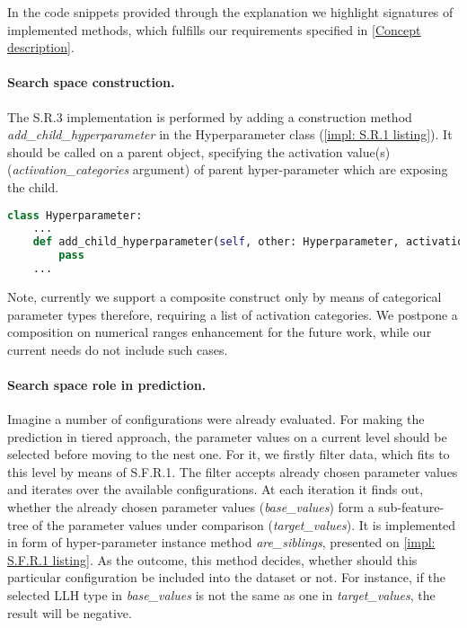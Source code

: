 In the code snippets provided through the explanation we highlight signatures of implemented methods, which fulfills our requirements specified in \cref{Concept description}.

\paragraph{Search space construction.} The S.R.3 implementation is performed by adding a construction method \emph{add\_child\_hyperparameter} in the Hyperparameter class (\cref{impl: S.R.1 listing}). It should be called on a parent object, specifying the activation value(s) (\emph{activation\_categories} argument) of parent hyper-parameter which are exposing the child. 

\begin{lstlisting}[language=Python, caption=S.R.1 implementation., label=impl: S.R.1 listing]
class Hyperparameter:
	...
	def add_child_hyperparameter(self, other: Hyperparameter, activation_categories: Iterable[CATEGORY]) -> Hyperparameter:
		pass
	...
\end{lstlisting}

Note, currently we support a composite construct only by means of categorical parameter types therefore, requiring a list of activation categories. We postpone a composition on numerical ranges enhancement for the future work, while our current needs do not include such cases.

\paragraph{Search space role in prediction.}
Imagine a number of configurations were already evaluated. For making the prediction in tiered approach, the parameter values on a current level should be selected before moving to the nest one. For it, we firstly filter data, which fits to this level by means of S.F.R.1. The filter accepts already chosen parameter values and iterates over the available configurations. At each iteration it finds out, whether the already chosen parameter values (\emph{base\_values}) form a sub-feature-tree of the parameter values under comparison (\emph{target\_values}). It is implemented in form of hyper-parameter instance method \emph{are\_siblings}, presented on \cref{impl: S.F.R.1 listing}. As the outcome, this method decides, whether should this particular configuration be included into the dataset or not. For instance, if the selected LLH type in \emph{base\_values} is not the same as one in \emph{target\_values}, the result will be negative.

